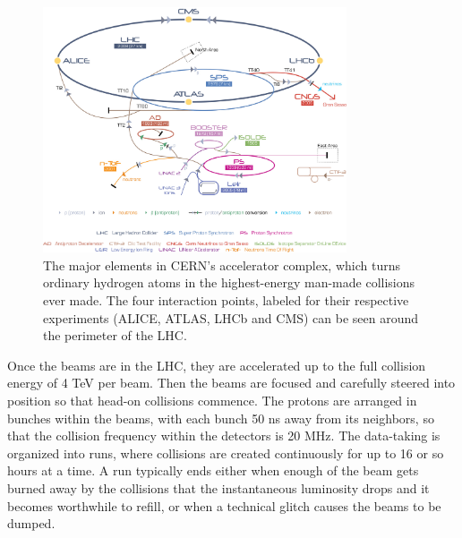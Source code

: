 \begin{figure}
	\centering
	\includegraphics[width=0.8\textwidth]{ATLASDetector/images/Cern-Accelerator-Complex.pdf}
	\caption{ The major elements in CERN's accelerator complex, which turns ordinary hydrogen atoms in the highest-energy man-made collisions ever made. The four interaction points, labeled for their respective experiments (ALICE, ATLAS, LHCb and CMS) can be seen around the perimeter of the LHC. \label{fig:accelerator_complex}}
\end{figure}



Once the beams are in the LHC, they are accelerated up to the full collision energy of 4 TeV 
per beam.  Then the beams are focused  and carefully steered into position so that head-on collisions commence.  
The protons are arranged in bunches within the beams, with each bunch 50 ns away from its neighbors, 
so that the collision frequency within the detectors is 20 MHz.  The data-taking is organized into 
runs, where collisions are created continuously for up to 16 or so hours at a time.  A run 
typically ends either when enough of the beam gets burned away by the collisions that the instantaneous luminosity drops and 
it becomes worthwhile to refill, or when a technical glitch causes the beams to be dumped.

